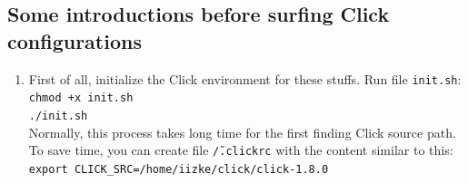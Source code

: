 \documentclass[a4paper]{article}
\begin{document}
    \subsection{Some introductions before surfing Click configurations}
      \begin{enumerate}
      	\item 
      	  First of all, initialize the Click environment for these stuffs. Run file \texttt{init.sh}: \\
      	    \texttt{chmod +x init.sh\\
      	    ./init.sh}\\
      	  Normally, this process takes long time for the first finding Click source path. To save time, you can create file \texttt{\~/.clickrc} with the content similar to this:\\
            \texttt{export CLICK\_SRC=/home/iizke/click/click-1.8.0}
        

\end{enumerate}
\end{document}
